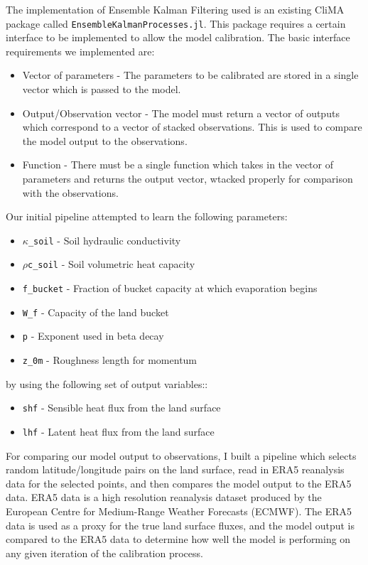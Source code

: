 \documentclass[11pt, a4paper]{article}
\begin{document}
The implementation of Ensemble Kalman Filtering used is an existing CliMA
package called \texttt{EnsembleKalmanProcesses.jl}. This package requires a
certain interface to be implemented to allow the model calibration. The basic
interface requirements we implemented are:

\begin{itemize}
    \item Vector of parameters - The parameters to be calibrated are stored in a
          single vector which is passed to the model.
    \item Output/Observation vector - The model must return a vector of outputs
          which correspond to a vector of stacked observations. This is used to
          compare the model output to the observations.
    \item Function - There must be a single function which takes in the vector
          of parameters and returns the output vector, wtacked properly for
          comparison with the observations.
\end{itemize}

Our initial pipeline attempted to learn the following parameters:
\begin{itemize}
    \item \texttt{$\kappa$\_soil} - Soil hydraulic conductivity
    \item \texttt{$\rho$c\_soil} - Soil volumetric heat capacity
    \item \texttt{f\_bucket} - Fraction of bucket capacity at which evaporation
                               begins
    \item \texttt{W\_f} - Capacity of the land bucket
    \item \texttt{p} - Exponent used in beta decay
    \item \texttt{z\_0m} - Roughness length for momentum
\end{itemize}

by using the following set of output variables::
\begin{itemize}
    \item \texttt{shf} - Sensible heat flux from the land surface
    \item \texttt{lhf} - Latent heat flux from the land surface
\end{itemize}

For comparing our model output to observations, I built a pipeline which selects
random latitude/longitude pairs on the land surface, read in ERA5 reanalysis
data for the selected points, and then compares the model output to the ERA5
data. ERA5 data is a high resolution reanalysis dataset produced by the European
Centre for Medium-Range Weather Forecasts (ECMWF). The ERA5 data is used as a
proxy for the true land surface fluxes, and the model output is compared to the
ERA5 data to determine how well the model is performing on any given iteration
of the calibration process.
\end{document}
